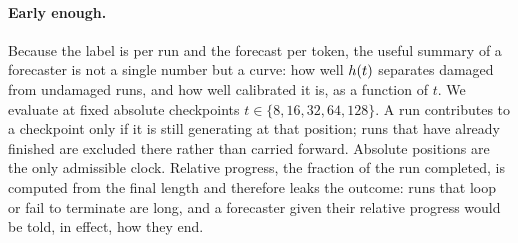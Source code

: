\paragraph{Early enough.}
Because the label is per run and the forecast per token, the useful summary
of a forecaster is not a single number but a curve: how well $h(t)$
separates damaged from undamaged runs, and how well calibrated it is, as a
function of $t$. We evaluate at fixed absolute checkpoints
$t \in \{8, 16, 32, 64, 128\}$. A run contributes to a checkpoint only if it
is still generating at that position; runs that have already finished are
excluded there rather than carried forward. Absolute positions are the only
admissible clock. Relative progress, the fraction of the run completed, is
computed from the final length and therefore leaks the outcome: runs that
loop or fail to terminate are long, and a forecaster given their relative
progress would be told, in effect, how they end.
